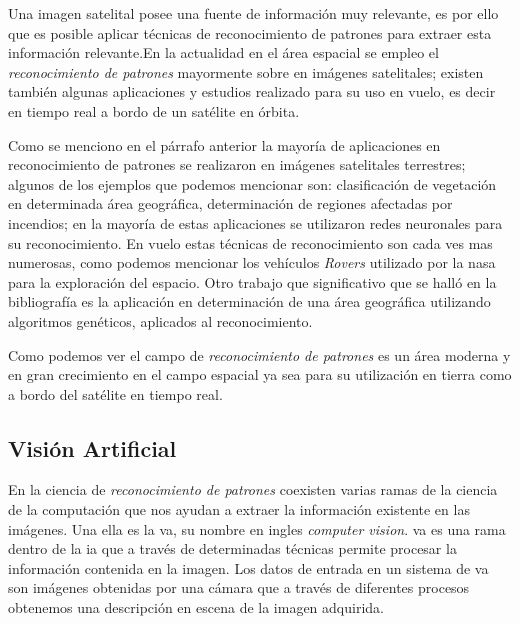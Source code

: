 Una imagen satelital posee una fuente de información muy relevante, es por ello que es posible aplicar técnicas de reconocimiento de patrones para extraer esta información relevante.En la actualidad en el área espacial se empleo el \textit{reconocimiento de patrones} mayormente sobre en imágenes satelitales; existen también algunas aplicaciones y estudios realizado para su uso en vuelo, es decir en tiempo real a bordo de un satélite en órbita. 

Como se menciono en el párrafo anterior la mayoría de aplicaciones en reconocimiento de patrones  se realizaron en imágenes satelitales terrestres; algunos de los ejemplos que podemos mencionar son: clasificación de vegetación en determinada área geográfica, determinación de regiones afectadas por incendios; en la  mayoría de estas aplicaciones se utilizaron redes neuronales 
para su reconocimiento. En vuelo estas técnicas de reconocimiento son cada ves mas numerosas, como podemos mencionar los  vehículos \textit{Rovers} utilizado por la \ac{nasa} para la exploración del espacio. Otro trabajo que significativo que se halló en la bibliografía es la aplicación en determinación de una área geográfica utilizando algoritmos genéticos, aplicados al reconocimiento. 

Como podemos ver el campo de \textit{reconocimiento de patrones} es un área moderna y en gran crecimiento en el campo espacial ya sea para su utilización en tierra como a bordo del satélite en tiempo real.


\subsection{Visión Artificial}\label{sub:introva}
En la ciencia de \textit{reconocimiento de patrones} coexisten varias ramas de la ciencia de la computación que nos ayudan a extraer la información existente en las imágenes. Una  ella es la \ac{va}, su nombre en ingles \textit{computer vision}.  \ac{va} es una rama dentro de la \ac{ia} que a través de determinadas técnicas permite procesar la información contenida en la imagen. Los datos de entrada en un sistema de \ac{va} son imágenes obtenidas por una cámara que a través de diferentes procesos obtenemos una descripción en escena de la imagen adquirida.
 
